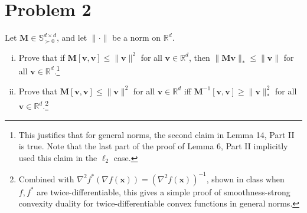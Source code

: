\section*{Problem 2}

Let $\mathbf{M} \in \mathbb{S}^{d \times d}_{\succ 0}$, and let $\|\cdot\|$ be a norm on $\mathbb{R}^d$.

\begin{enumerate}[(i)]
    \item Prove that if $\mathbf{M}[\mathbf{v}, \mathbf{v}] \leq \|\mathbf{v}\|^2$ for all $\mathbf{v} \in \mathbb{R}^d$, then $\|\mathbf{M}\mathbf{v}\|_* \leq \|\mathbf{v}\|$ for all $\mathbf{v} \in \mathbb{R}^d$.\footnote{This justifies that for general norms, the second claim in Lemma 14, Part II is true. Note that the last part of the proof of Lemma 6, Part II implicitly used this claim in the $\ell_2$ case.}

    \item Prove that $\mathbf{M}[\mathbf{v}, \mathbf{v}] \leq \|\mathbf{v}\|^2$ for all $\mathbf{v} \in \mathbb{R}^d$ iff $\mathbf{M}^{-1}[\mathbf{v}, \mathbf{v}] \geq \|\mathbf{v}\|_*^2$ for all $\mathbf{v} \in \mathbb{R}^d$.\footnote{Combined with $\nabla^2 f^*(\nabla f(\mathbf{x})) = (\nabla^2 f(\mathbf{x}))^{-1}$, shown in class when $f, f^*$ are twice-differentiable, this gives a simple proof of smoothness-strong convexity duality for twice-differentiable convex functions in general norms.}
\end{enumerate}
